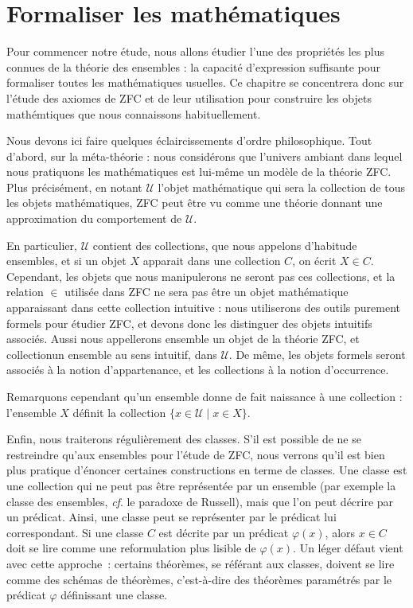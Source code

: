 \chapter{Formaliser les mathématiques}
\label{chp.axiomes}

Pour commencer notre étude, nous allons étudier l'une des propriétés les plus
connues de la théorie des ensembles : la capacité d'expression suffisante pour
formaliser toutes les mathématiques usuelles. Ce chapitre se concentrera donc
sur l'étude des axiomes de ZFC et de leur utilisation pour construire les objets
mathémtiques que nous connaissons habituellement.

Nous devons ici faire quelques éclaircissements d'ordre philosophique. Tout
d'abord, sur la méta-théorie : nous considérons que l'univers ambiant dans
lequel nous pratiquons les mathématiques est lui-même un modèle de la théorie
ZFC. Plus précisément, en notant $\mathcal U$ l'objet mathématique qui sera la
collection de tous les objets mathématiques, ZFC peut être vu comme une théorie
donnant une approximation du comportement de $\mathcal U$.

En particulier, $\mathcal U$ contient des collections, que nous appelons
d'habitude ensembles, et si un objet $X$ apparait dans une collection $C$, on
écrit $X\in C$. Cependant, les objets que nous manipulerons ne seront pas ces
collections, et la relation $\in$ utilisée dans ZFC ne sera pas \og être un
objet mathématique apparaissant dans cette collection intuitive\fg{} : nous
utiliserons des outils purement formels pour étudier ZFC, et devons donc les
distinguer des objets intuitifs associés. Aussi nous appellerons \og ensemble\fg
un objet de la théorie ZFC, et \og collection\fg un ensemble au sens intuitif,
dans $\mathcal U$. De même, les objets formels seront associés à la notion
d'appartenance, et les collections à la notion d'occurrence.

Remarquons cependant qu'un ensemble donne de fait naissance à une
collection : l'ensemble $X$ définit la collection
$\{ x \in\mathcal U\mid x \in X \}$.

Enfin, nous traiterons régulièrement des classes. S'il est possible de ne se
restreindre qu'aux ensembles pour l'étude de ZFC, nous verrons qu'il est bien
plus pratique d'énoncer certaines constructions en terme de classes. Une classe
est une collection qui ne peut pas être représentée par un ensemble (par exemple
la classe des ensembles, \textit{cf}. le paradoxe de Russell), mais que l'on
peut décrire par un prédicat. Ainsi, une classe peut se représenter par le
prédicat lui correspondant. Si une classe $C$ est décrite par un prédicat
$\varphi(x)$, alors $x\in C$ doit se lire comme une reformulation plus lisible
de $\varphi(x)$. Un léger défaut vient avec cette approche~: certains théorèmes,
se référant aux classes, doivent se lire comme des schémas de théorèmes,
c'est-à-dire des théorèmes paramétrés par le prédicat $\varphi$ définissant une
classe.

